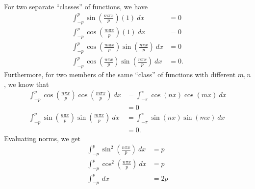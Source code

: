 \documentclass[10pt]{mypackage}
\begin{document}
\begin{solution}[11.1, Problem 12]
  For two separate ``classes'' of functions, we have
  \begin{align*}
    \int_{-p}^{p} \sin\left( \frac{m\pi x}{p} \right)\left( 1 \right)\:dx &= 0\\
    \int_{-p}^{p} \cos\left( \frac{m\pi x}{p} \right)\left( 1 \right)\:dx &= 0\\
    \int_{-p}^{p} \cos\left( \frac{m\pi x}{p} \right)\sin\left( \frac{n\pi x}{p} \right)\:dx &= 0\\
    \int_{-p}^{p} \cos\left( \frac{n\pi x}{p} \right)\sin\left( \frac{n\pi x}{p} \right)\:dx &= 0.
  \end{align*}
  Furthermore, for two members of the same ``class'' of functions with different $m,n$, we know that
  \begin{align*}
    \int_{-p}^{p} \cos\left( \frac{n\pi x}{p} \right) \cos\left( \frac{m\pi x}{p} \right)\:dx &= \int_{-\pi}^{\pi} \cos\left( nx \right)\cos\left( mx \right)\:dx\\
                                                                                              &= 0\\
    \int_{-p}^{p} \sin\left( \frac{n\pi x}{p} \right) \sin\left( \frac{m\pi x}{p} \right)\:dx &= \int_{-\pi}^{\pi} \sin\left( nx \right)\sin\left( mx \right)\:dx\\
                                                                                              &= 0.
  \end{align*}
  Evaluating norms, we get
  \begin{align*}
    \int_{-p}^{p} \sin^2\left( \frac{n\pi x}{p} \right)\:dx &= p\\
    \int_{-p}^{p} \cos^2\left( \frac{n\pi x}{p} \right)\:dx &= p\\
    \int_{-p}^{p} \:dx &= 2p\\
  \end{align*}
  
\end{solution}
\end{document}
